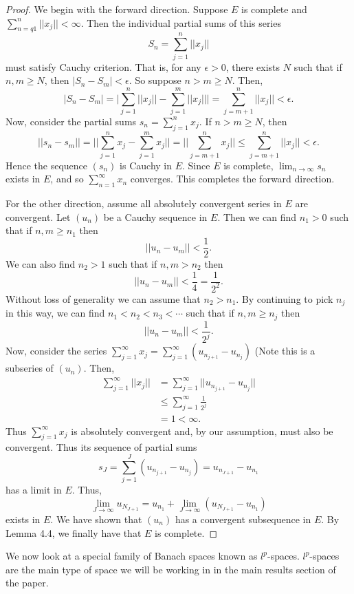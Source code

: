 \begin{proof}
We begin with the forward direction.  Suppose $E$ is complete and $\sum_{n=q1}^{n}||x_j|| < \infty$.  Then the individual partial sums of this series
\[S_n = \sum_{j=1}^{n}||x_j||\]
must satisfy Cauchy criterion.  That is, for any $\epsilon > 0$, there exists $N$ such that if $n, m \geq N$, then $|S_n - S_m| < \epsilon$.  So suppose $n > m \geq N$.  Then,
\[|S_n - S_m| = \biggl|\sum_{j=1}^{n} ||x_j|| - \sum_{j=1}^{m} ||x_j||\biggr| = \sum_{j = m+1}^{n} ||x_j|| < \epsilon.\]
Now, consider the partial sums $s_n = \sum_{j=1}^{n} x_j$.  If $n>m\geq N$, then
\[||s_n - s_m|| = \biggl|\biggl|\sum_{j=1}^{n} x_j - \sum_{j=1}^{m} x_j\biggr|\biggr| = \biggl|\biggl|\sum_{j = m+1}^{n} x_j\biggr|\biggr| \leq \sum_{j=m+1}^{n} ||x_j|| < \epsilon.\]
Hence the sequence $(s_n)$ is Cauchy in $E$.  Since $E$ is complete, $\lim_{n \to \infty} s_n$ exists in $E$, and so $\sum_{n=1}^{\infty} x_n$ converges.  This completes the forward direction.

For the other direction, assume all absolutely convergent series in $E$ are convergent.  Let $(u_n)$ be a Cauchy sequence in $E$.  Then we can find $n_1 > 0$ such that if $n,m \geq n_1$ then 
\[||u_n - u_m|| < \frac{1}{2}.\]
We can also find $n_2 > 1$ such that if $n,m > n_2$ then
\[||u_n - u_m|| < \frac{1}{4} = \frac{1}{2^2}.\]
Without loss of generality we can assume that $n_2 > n_1$.  By continuing to pick $n_j$ in this way, we can find $n_1 < n_2 < n_3 < \cdots$ such that if $n,m \geq n_j$ then
\[||u_n - u_m|| < \frac{1}{2^j}.\]
Now, consider the series $\sum_{j=1}^{\infty}x_j = \sum_{j=1}^{\infty}(u_{n_{j+1}} - u_{n_j})$ (Note this is a subseries of $(u_n)$.  Then,
\begin{align*}
\sum_{j=1}^{\infty}||x_j|| &= \sum_{j=1}^{\infty}||u_{n_{j+1}} - u_{n_j}||\\
&\leq \sum_{j=1}^{\infty} \frac{1}{2^j}\\
&= 1 < \infty.
\end{align*}
Thus $\sum_{j=1}^{\infty}x_j$ is absolutely convergent and, by our assumption, must also be convergent.  Thus its sequence of partial sums
\[s_J = \sum_{j=1}^{J}(u_{n_{j+1}} - u_{n_j}) = u_{n_{J+1}} - u_{n_1}\]
has a limit in $E$.  Thus,
\[\lim_{J \to \infty} u_{N_{J+1}} = u_{n_1} + \lim_{J \to \infty} (u_{N_{J+1}} - u_{n_1})\]
exists in $E$.  We have shown that $(u_n)$ has a convergent subsequence in $E$.  By Lemma 4.4, we finally have that $E$ is complete.
\end{proof}

We now look at a special family of Banach spaces known as $l^p$-spaces.  $l^p$-spaces are the main type of space we will be working in in the main results section of the paper.

